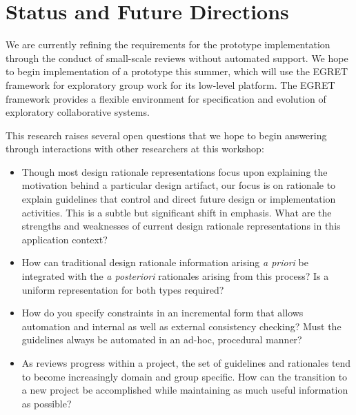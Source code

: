 \section{Status and Future Directions}

We are currently refining the requirements for the prototype
implementation through the conduct of small-scale reviews without
automated support.  We hope to begin implementation of a prototype
this summer, which will use the EGRET framework for exploratory group
work \cite{csdl-92-01} for its low-level platform.  The EGRET framework
provides a flexible environment for specification and evolution of
exploratory collaborative systems.

This research raises several open questions that we hope to begin
answering through interactions with other researchers at this workshop:

\begin{itemize}
  
\item Though most design rationale representations focus upon
  explaining the motivation behind a particular design artifact, our
  focus is on rationale to explain guidelines that control and direct
  future design or implementation activities. This is a subtle but
  significant shift in emphasis.  What are the strengths and
  weaknesses of current design rationale representations in this
  application context?  
  
\item How can traditional design rationale information arising {\em
  a priori} be integrated with the {\em a posteriori} rationales
  arising from this process? Is a uniform representation for both
  types required?

\item How do you specify constraints in an incremental form that
  allows automation and internal as well as external consistency
  checking?  Must the guidelines always be automated in an ad-hoc,
  procedural manner?
  
\item As reviews progress within a project, the set of guidelines and
  rationales tend to become increasingly domain and group specific.  How
  can the transition to a new project be accomplished while maintaining
  as much useful information as possible?

\end{itemize}











 

